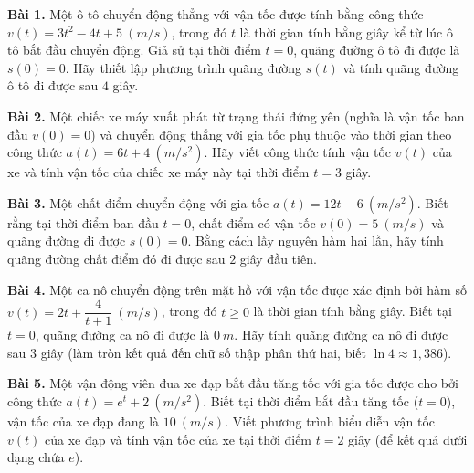 \documentclass[12pt]{article}
\begin{document}
	\begin{btxanh}[]
		\textbf{Bài 1.} Một ô tô chuyển động thẳng với vận tốc được tính bằng công thức $v(t) = 3t^2 - 4t + 5 \ (m/s)$, trong đó $t$ là thời gian tính bằng giây kể từ lúc ô tô bắt đầu chuyển động. Giả sử tại thời điểm $t = 0$, quãng đường ô tô đi được là $s(0) = 0$. Hãy thiết lập phương trình quãng đường $s(t)$ và tính quãng đường ô tô đi được sau $4$ giây.
		
		\textbf{Bài 2.} Một chiếc xe máy xuất phát từ trạng thái đứng yên (nghĩa là vận tốc ban đầu $v(0) = 0$) và chuyển động thẳng với gia tốc phụ thuộc vào thời gian theo công thức $a(t) = 6t + 4 \ (m/s^2)$. Hãy viết công thức tính vận tốc $v(t)$ của xe và tính vận tốc của chiếc xe máy này tại thời điểm $t = 3$ giây.
		
		\textbf{Bài 3.} Một chất điểm chuyển động với gia tốc $a(t) = 12t - 6 \ (m/s^2)$. Biết rằng tại thời điểm ban đầu $t = 0$, chất điểm có vận tốc $v(0) = 5 \ (m/s)$ và quãng đường đi được $s(0) = 0$. Bằng cách lấy nguyên hàm hai lần, hãy tính quãng đường chất điểm đó đi được sau $2$ giây đầu tiên.
		
		\textbf{Bài 4.} Một ca nô chuyển động trên mặt hồ với vận tốc được xác định bởi hàm số $v(t) = 2t + \dfrac{4}{t+1} \ (m/s)$, trong đó $t \ge 0$ là thời gian tính bằng giây. Biết tại $t = 0$, quãng đường ca nô đi được là $0 \ m$. Hãy tính quãng đường ca nô đi được sau $3$ giây (làm tròn kết quả đến chữ số thập phân thứ hai, biết $\ln 4 \approx 1,386$).
		
		\textbf{Bài 5.} Một vận động viên đua xe đạp bắt đầu tăng tốc với gia tốc được cho bởi công thức $a(t) = e^t + 2 \ (m/s^2)$. Biết tại thời điểm bắt đầu tăng tốc ($t = 0$), vận tốc của xe đạp đang là $10 \ (m/s)$. Viết phương trình biểu diễn vận tốc $v(t)$ của xe đạp và tính vận tốc của xe tại thời điểm $t = 2$ giây (để kết quả dưới dạng chứa $e$).
	\end{btxanh}
	
\end{document}
